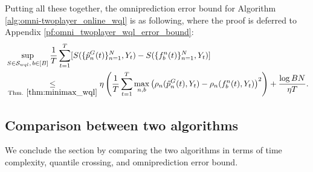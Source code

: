 Putting all these together, the omniprediction error bound for Algorithm \ref{alg:omni-twoplayer_online_wql} is as following, where the proof is deferred to Appendix \ref{pf:omni_twoplayer_wql_error_bound}:
\begin{align}
& \sup_{S \in \mathcal{S}_{wql},\, b \in [B]} \frac{1}{T} \sum_{t=1}^T [S(\{\hat{p}^G_n(t)\}_{n=1}^N, Y_t) - S(\{f_b^n(t)\}_{n=1}^N, Y_t)] \\
& \underset{\text{Thm. } \ref{thm:minimax_wql}}{\leq} \eta \left(\frac{1}{T} \sum_{t=1}^T \max_{n,b} \left(\rho_{n}(\hat{p}^G_n(t), Y_t) - \rho_{n}(f_b^n(t), Y_t)\right)^2\right) + \frac{\log BN}{\eta T}. \label{eq:omni_twoplayer_wql_error_bound}
\end{align}



\subsection{Comparison between two algorithms} \label{subsec:comparison_wql}
We conclude the section by comparing the two algorithms in terms of time complexity, quantile crossing, and omniprediction error bound.

